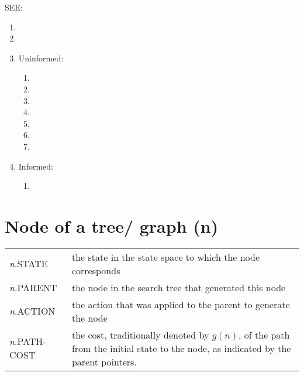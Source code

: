 SEE:
\begin{enumerate}
    \item {}
    \item {}
    
    \item Uninformed:
    \begin{enumerate}
        \item {}
        \item {}
        \item {}
        \item {}
        \item {}
        \item {}
        \item {}
    \end{enumerate}
    
    \item Informed:
    \begin{enumerate}
        \item 
    \end{enumerate}
\end{enumerate}


\section{Node of a tree/ graph (n)}
\begin{table}[H]
    \centering
    \begin{tabular}{l p{8cm}}
        \textit{n}.STATE & the state in the state space to which the node corresponds \\
        
        \textit{n}.PARENT & the node in the search tree that generated this node\\
        
        \textit{n}.ACTION &  the action that was applied to the parent to generate the node \\
        
        \textit{n}.PATH-COST & the cost, traditionally denoted by $g(n)$, of the path from the initial state to the node, as indicated by the parent pointers.
    \end{tabular}
\end{table}


